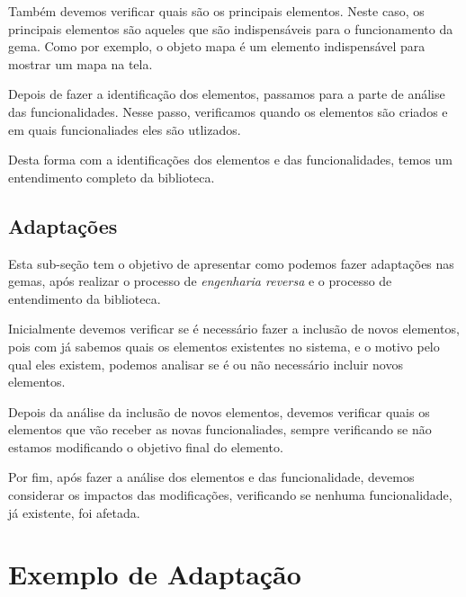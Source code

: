 Também devemos verificar quais são os principais elementos. Neste caso, os principais elementos
são aqueles que são indispensáveis para o funcionamento da gema. Como por exemplo, o objeto mapa
é um elemento indispensável para mostrar um mapa na tela.

Depois de fazer a identificação dos elementos, passamos para a parte de análise das funcionalidades.
Nesse passo, verificamos quando os elementos são criados e em quais funcionaliades eles são utlizados.

Desta forma com a identificações dos elementos e das funcionalidades, temos um entendimento completo da
biblioteca.


\subsection{Adaptações}
\label{subsection:adaptações}


Esta sub-seção tem o objetivo de apresentar como podemos fazer adaptações nas gemas, após realizar o
processo de \emph{engenharia reversa} e o processo de entendimento da biblioteca.

Inicialmente devemos verificar se é necessário fazer a inclusão de novos elementos, pois com já sabemos
quais os elementos existentes no sistema, e o motivo pelo qual eles existem, podemos analisar se é ou não
necessário incluir novos elementos.

Depois da análise da inclusão de novos elementos, devemos verificar quais os elementos que vão receber
as novas funcionaliades, sempre verificando se não estamos modificando o objetivo final do elemento.

Por fim, após fazer a análise dos elementos e das funcionalidade, devemos considerar os impactos das modificações,
verificando se nenhuma funcionalidade, já existente, foi afetada.


\section{Exemplo de Adaptação}
\label{section:exemplo_de_adaptação}

